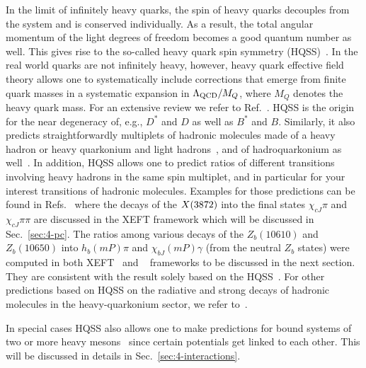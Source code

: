  In the limit of infinitely heavy quarks, the spin of heavy quarks decouples
 from the system and is conserved individually. As a result, the total angular
 momentum of the light degrees of freedom becomes a good quantum number as well.
 This gives rise to the so-called heavy quark spin symmetry
 (HQSS)~\cite{Isgur:1989vq}.
 In the real world quarks  are not infinitely heavy, however, heavy quark
 effective field theory allows one to systematically include corrections that
 emerge from finite quark masses
in a systematic expansion in $\Lambda_{\rm QCD}/M_Q$, where $M_Q$ denotes the
heavy quark mass. For an extensive review we refer to
Ref.~\cite{Neubert:1993mb}. HQSS is the origin for the near degeneracy of, e.g.,
$D^*$ and $D$ as well as $B^*$ and $B$. Similarly, it also predicts
straightforwardly multiplets of hadronic molecules made of a heavy hadron or
heavy quarkonium and light hadrons~\cite{Guo:2009id,Yamaguchi:2014era}, and of
hadroquarkonium as well~\cite{Cleven:2015era}.
In addition, HQSS allows one to predict ratios of different transitions
involving heavy hadrons in the same spin multiplet, and in particular for your
interest transitions of hadronic molecules.
Examples for those predictions can be found in
Refs.~\cite{Fleming:2008yn,Fleming:2011xa} where the decays of the $X(3872)$ into the
final states $\chi_{cJ}\pi$ and $\chi_{cJ}\pi\pi$ are discussed in the XEFT
framework {which will be discussed in Sec.~\ref{sec:4-pc}}. The ratios
among various decays of the $Z_b(10610)$ and $Z_b(10650)$ into $h_b(mP)\pi$ and
$\chi_{bJ}(mP)\gamma$ (from the neutral $Z_b$ states) were computed in both
XEFT~\cite{Mehen:2011yh} and \nreft~\cite{Cleven:2013sq} frameworks to be
discussed in the next section.
They are consistent with the result solely based on the
HQSS~\cite{Ohkoda:2012rj}.
For other predictions based on HQSS on the radiative and strong decays of
hadronic molecules in the heavy-quarkonium sector, we refer
to~\cite{Ma:2014ofa,Ma:2014zva}.

In special cases HQSS also allows one to make predictions for bound systems of
two or more heavy
mesons~\cite{Voloshin:2011qa,Mehen:2011yh,Nieves:2012tt,Guo:2013sya,Liu:2013rxa,
Baru:2016iwj} since certain potentials get linked to each
other. This will be discussed in details in Sec.~\ref{sec:4-interactions}.

